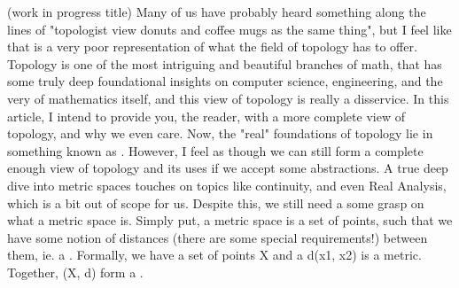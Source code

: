 \markdownRendererDocumentBegin
\markdownRendererSectionBegin
{}\markdownRendererInterblockSeparator
{}(work in progress title)\markdownRendererParagraphSeparator
{}Many of us have probably heard something along the lines of\markdownRendererSoftLineBreak
{}"topologist view donuts and coffee mugs as the same thing", but I\markdownRendererSoftLineBreak
{}feel like that is a very poor representation of what the field of\markdownRendererSoftLineBreak
{}topology has to offer.\markdownRendererSoftLineBreak
{}Topology is one of the most intriguing and beautiful branches of\markdownRendererSoftLineBreak
{}math, that has some truly deep foundational insights on\markdownRendererSoftLineBreak
{}computer science, engineering, and the very  of\markdownRendererSoftLineBreak
{}mathematics itself, and this view of topology is really a\markdownRendererSoftLineBreak
{}disservice. In this article, I intend to provide you, the reader,\markdownRendererSoftLineBreak
{}with a more complete view of topology, and why we even care.\markdownRendererInterblockSeparator
{}\markdownRendererSectionBegin
{}\markdownRendererInterblockSeparator
{}Now, the "real" foundations of topology lie in something known as\markdownRendererSoftLineBreak
{}. However, I feel as though we can still form a\markdownRendererSoftLineBreak
{}complete enough view of topology and its uses if we accept some\markdownRendererSoftLineBreak
{}abstractions. A true deep dive into metric spaces touches on\markdownRendererSoftLineBreak
{}topics like continuity, and even Real Analysis, which is a bit\markdownRendererSoftLineBreak
{}out of scope for us. Despite this, we still need a some grasp\markdownRendererSoftLineBreak
{}on what a metric space is.\markdownRendererInterblockSeparator
{}\markdownRendererSectionBegin
{}\markdownRendererInterblockSeparator
{}Simply put, a metric space is a set of points, such that we have\markdownRendererSoftLineBreak
{}some notion of distances (there are some special requirements!)\markdownRendererSoftLineBreak
{}between them, ie. a . Formally, we have a set of points \markdownRendererDollarSign{}X\markdownRendererDollarSign{}\markdownRendererSoftLineBreak
{}and a \markdownRendererDollarSign{}d(x\markdownRendererUnderscore{}1, x\markdownRendererUnderscore{}2)\markdownRendererDollarSign{} is a metric. Together, \markdownRendererDollarSign{}(X, d)\markdownRendererDollarSign{} form a .\markdownRendererParagraphSeparator
